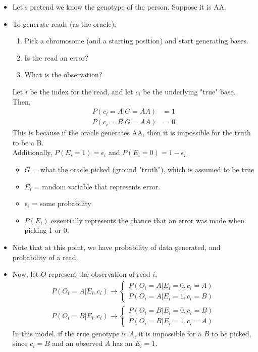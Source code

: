\documentclass[10pt]{article}
\begin{document}
\begin{itemize}
    \item Let's pretend we know the genotype of the person.  Suppose it is AA.
    \item To generate reads (as the oracle):
    \begin{enumerate}
        \item Pick a chromosome (and a starting position) and start generating bases.
        \item Is the read an error?
        \item What is the observation?
    \end{enumerate}
    Let $i$ be the index for the read, and let $c_i$ be the underlying "true" base.\\
    Then, 
    \begin{align*}
    P(c_i = A \vert G = AA) &= 1\\
    P(c_i = B \vert G = AA) &= 0
    \end{align*}
    This is because if the oracle generates AA, then it is impossible for the truth to be a B.\\
    Additionally, $P(E_i = 1) = \epsilon_i$ and $P(E_i = 0) = 1 - \epsilon_i$.
    \begin{itemize}
        \item $G$ = what the oracle picked (ground "truth"), which is assumed to be true
        \item $E_i$ = random variable that represents error.
        \item $\epsilon_i$ = some probability
        \item $P(E_i)$ essentially represents the chance that an error was made when picking 1 or 0.
    \end{itemize}
    \item Note that at this point, we have probability of data generated, and probability of a read.
    \item Now, let $O$ represent the observation of read $i$.
    \begin{align*}
        P(O_i = A \vert E_i, c_i) \rightarrow \begin{cases} P(O_i = A \vert E_i = 0, c_i = A) \\ P(O_i = A \vert E_i = 1, c_i = B)\end{cases}\\
        P(O_i = B \vert E_i, c_i) \rightarrow \begin{cases} P(O_i = B \vert E_i = 0, c_i = B) \\ P(O_i = B \vert E_i = 1, c_i = A)\end{cases}
    \end{align*}
    In this model, if the true genotype is $A$, it is impossible for a $B$ to be picked, since $c_i = B$ and an observed $A$ has an $E_i = 1$.  

\end{itemize}
\end{document}
